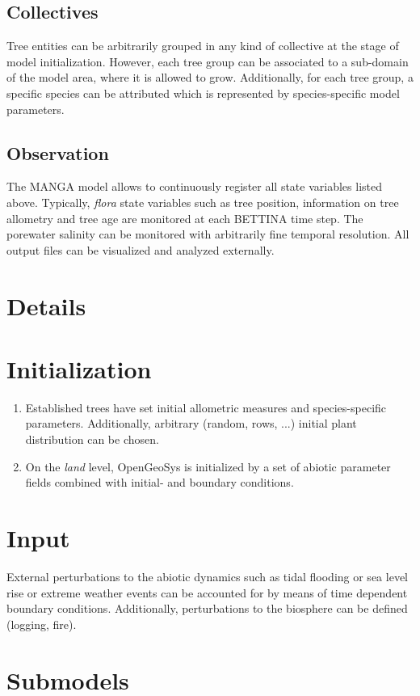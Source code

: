 \documentclass[manusscript, 12p, authoryear]{elsarticle}
\begin{document}
\subsection{Collectives}
Tree entities can be arbitrarily grouped in any kind of collective at the stage of model initialization. 
However, each tree group can be associated to a sub-domain of the model area, where it is allowed to grow.
Additionally, for each tree group, a specific species can be attributed which is represented by species-specific model parameters.
\subsection{Observation}
The MANGA model allows to continuously register all state variables listed above.
Typically, \textit{flora} state variables such as tree position, information on tree allometry and tree age are monitored at each BETTINA time step.
The porewater salinity can be monitored with arbitrarily fine temporal resolution.
All output files can be visualized and analyzed externally.

\section*{Details}
\section{Initialization}
\begin{enumerate}
\item Established trees have set initial allometric measures and species-specific parameters.
Additionally, arbitrary (random, rows, ...) initial plant distribution can be chosen.
\item On the \textit{land} level, OpenGeoSys is initialized by a set of abiotic parameter fields combined with initial- and boundary conditions.
\end{enumerate}
\section{Input}
External perturbations to the abiotic dynamics such as tidal flooding or sea level rise or extreme weather events can be accounted for by means of time dependent boundary conditions.
Additionally, perturbations to the biosphere can be defined (logging, fire). 
\section{Submodels}
\end{document}
